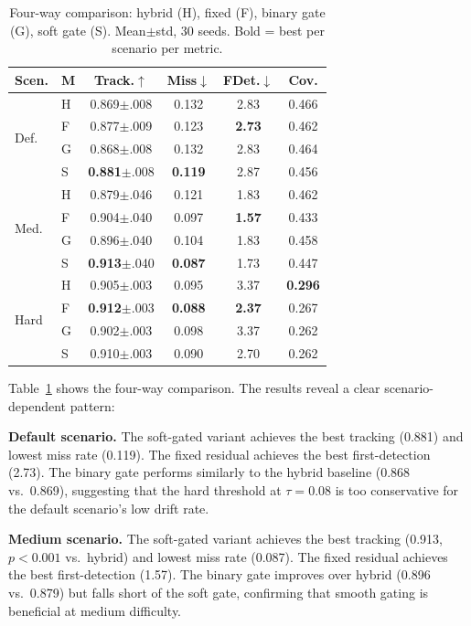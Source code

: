 \documentclass[journal]{IEEEtran}
\begin{document}
\begin{table}[t]
\centering
\caption{Four-way comparison: hybrid (H), fixed (F), binary gate (G), soft gate (S).
Mean$\pm$std, 30 seeds. Bold = best per scenario per metric.}
\label{tab:fourway}
\scriptsize
\setlength{\tabcolsep}{3pt}
\begin{tabular}{@{}llcccc@{}}
\toprule
Scen. & M & Track.$\uparrow$ & Miss$\downarrow$ & FDet.$\downarrow$ & Cov. \\
\midrule
\multirow{4}{*}{Def.}
  & H & 0.869\tiny{$\pm$.008} & 0.132 & 2.83 & 0.466 \\
  & F & 0.877\tiny{$\pm$.009} & 0.123 & \textbf{2.73} & 0.462 \\
  & G & 0.868\tiny{$\pm$.008} & 0.132 & 2.83 & 0.464 \\
  & S & \textbf{0.881}\tiny{$\pm$.008} & \textbf{0.119} & 2.87 & 0.456 \\
\midrule
\multirow{4}{*}{Med.}
  & H & 0.879\tiny{$\pm$.046} & 0.121 & 1.83 & 0.462 \\
  & F & 0.904\tiny{$\pm$.040} & 0.097 & \textbf{1.57} & 0.433 \\
  & G & 0.896\tiny{$\pm$.040} & 0.104 & 1.83 & 0.458 \\
  & S & \textbf{0.913}\tiny{$\pm$.040} & \textbf{0.087} & 1.73 & 0.447 \\
\midrule
\multirow{4}{*}{Hard}
  & H & 0.905\tiny{$\pm$.003} & 0.095 & 3.37 & \textbf{0.296} \\
  & F & \textbf{0.912}\tiny{$\pm$.003} & \textbf{0.088} & \textbf{2.37} & 0.267 \\
  & G & 0.902\tiny{$\pm$.003} & 0.098 & 3.37 & 0.262 \\
  & S & 0.910\tiny{$\pm$.003} & 0.090 & 2.70 & 0.262 \\
\bottomrule
\end{tabular}
\end{table}

Table~\ref{tab:fourway} shows the four-way comparison. The results reveal a clear
scenario-dependent pattern:

\textbf{Default scenario.} The soft-gated variant achieves the best tracking (0.881)
and lowest miss rate (0.119). The fixed residual achieves the best first-detection
(2.73). The binary gate performs similarly to the hybrid baseline (0.868 vs.\ 0.869),
suggesting that the hard threshold at $\tau = 0.08$ is too conservative for the
default scenario's low drift rate.

\textbf{Medium scenario.} The soft-gated variant achieves the best tracking (0.913,
$p < 0.001$ vs.\ hybrid) and lowest miss rate (0.087). The fixed residual achieves
the best first-detection (1.57). The binary gate improves over hybrid (0.896 vs.\
0.879) but falls short of the soft gate, confirming that smooth gating is beneficial
at medium difficulty.
\end{document}
